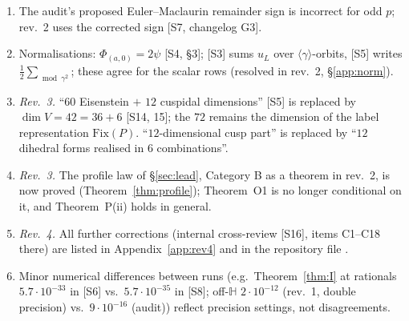 \documentclass[11pt]{article}
\theoremstyle{definition}
\newcommand{\Hb}{\mathbb{H}}
\newcommand{\src}[1]{\textup{[S#1]}}
\begin{document}
\begin{enumerate}[leftmargin=2em]
\src{6}: a twisted Herglotz form exists, and the cusp rows involve $L(0)$, not $L(\tfrac12)$.
\item The audit's proposed Euler--Maclaurin remainder sign is incorrect for odd $p$; rev.~2 uses the corrected sign \src{7, changelog G3}.
\item Normalisations: $\Phi_{(a,0)}=2\psi$ \src{4, \S3}; \src{3} sums $u_L$ over $\langle\gamma\rangle$-orbits, \src{5} writes $\tfrac12\sum_{\bmod\gamma^2}$;
these agree for the scalar rows (resolved in rev.~2, \S\ref{app:norm}).
\item \emph{Rev.~3.} ``$60$ Eisenstein $+$ $12$ cuspidal dimensions'' \src{5} is replaced by $\dim V=42=36+6$ \src{14, 15}; the $72$ remains the dimension of the
label representation $\mathrm{Fix}(P)$. ``$12$-dimensional cusp part'' is replaced by ``$12$ dihedral forms realised in $6$ combinations''.
\item \emph{Rev.~3.} The profile law of \S\ref{sec:lead}, Category B as a theorem in rev.~2, is now proved (Theorem~\ref{thm:profile}); Theorem~O1 is no longer
conditional on it, and Theorem~P(ii) holds in general.
\item \emph{Rev.~4.} All further corrections (internal cross-review \src{16}, items C1--C18 there) are listed in Appendix~\ref{app:rev4} and in the repository file
.
\item Minor numerical differences between runs (e.g.\ Theorem~\ref{thm:I} at rationals $5.7\cdot10^{-33}$ in \src{6} vs.\ $5.7\cdot10^{-35}$ in \src{8};
off-$\Hb$ $2\cdot10^{-12}$ (rev.~1, double precision) vs.\ $9\cdot10^{-16}$ (audit)) reflect precision settings, not disagreements.
\end{enumerate}

\end{document}
